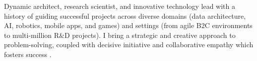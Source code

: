 


\begin{cvparagraph}








Dynamic architect, research scientist, and innovative technology lead with a history of guiding successful projects across diverse domains (data architecture, AI, robotics, mobile apps, and games) and settings (from agile B2C environments to multi-million R\&D projects). I bring a strategic and creative approach to problem-solving, coupled with decisive initiative and collaborative empathy which fosters success .



\end{cvparagraph}

\vspace{-0.5ex}
